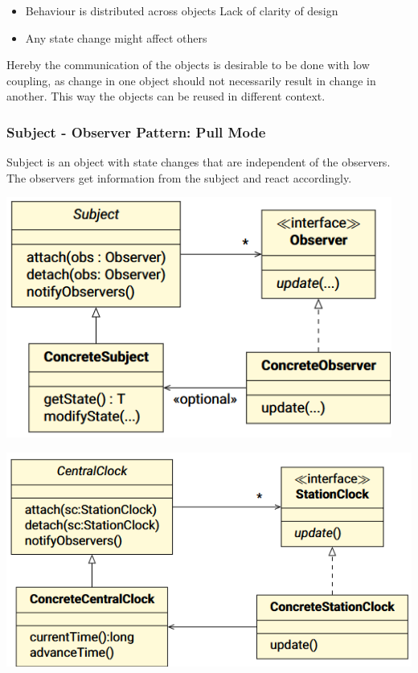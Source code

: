 \documentclass[
    ../../Software_Engineering_Summary.tex,
]
{subfiles}
\begin{document}
\begin{itemize}
    \item Behaviour is distributed across objects \rightarrow Lack of clarity of design
    \item Any state change might affect others
\end{itemize}

Hereby the communication of the objects is desirable to be done with low coupling, as change in one object should not necessarily result in change in another. This way the objects can be reused in different context.

\subsubsection{Subject - Observer Pattern: Pull Mode}
Subject is an object with state changes that are independent of the observers. The observers get information from the subject and react accordingly.

\begin{minipage}
    [t]{0.5\textwidth}
    \centering
    \includegraphics[width=0.95\textwidth]{Pics/ObserverPattern.png}
\end{minipage}
\hfill
\begin{minipage}
    [t]{0.5\textwidth}
    \centering
    \includegraphics[width=\textwidth]{Pics/ObserverPatternExample.png}
\end{minipage}
\end{document}
